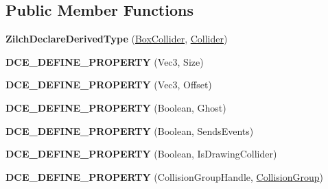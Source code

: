 \subsection*{Public Member Functions}
\begin{DoxyCompactItemize}
\item 
\hypertarget{classDCEngine_1_1Components_1_1BoxCollider_a307a276bd1efb29731cd1e6ab8234381}{{\bfseries Zilch\-Declare\-Derived\-Type} (\hyperlink{classDCEngine_1_1Components_1_1BoxCollider}{Box\-Collider}, \hyperlink{classDCEngine_1_1Components_1_1Collider}{Collider})}\label{classDCEngine_1_1Components_1_1BoxCollider_a307a276bd1efb29731cd1e6ab8234381}

\item 
\hypertarget{classDCEngine_1_1Components_1_1BoxCollider_a9ef080e6ea657589e6b0c5dcff467bad}{{\bfseries D\-C\-E\-\_\-\-D\-E\-F\-I\-N\-E\-\_\-\-P\-R\-O\-P\-E\-R\-T\-Y} (Vec3, Size)}\label{classDCEngine_1_1Components_1_1BoxCollider_a9ef080e6ea657589e6b0c5dcff467bad}

\item 
\hypertarget{classDCEngine_1_1Components_1_1BoxCollider_ac58ada13086efa016c4b0e22766acc6c}{{\bfseries D\-C\-E\-\_\-\-D\-E\-F\-I\-N\-E\-\_\-\-P\-R\-O\-P\-E\-R\-T\-Y} (Vec3, Offset)}\label{classDCEngine_1_1Components_1_1BoxCollider_ac58ada13086efa016c4b0e22766acc6c}

\item 
\hypertarget{classDCEngine_1_1Components_1_1BoxCollider_a292c0ad46d3c02aee5eff549be6db3e6}{{\bfseries D\-C\-E\-\_\-\-D\-E\-F\-I\-N\-E\-\_\-\-P\-R\-O\-P\-E\-R\-T\-Y} (Boolean, Ghost)}\label{classDCEngine_1_1Components_1_1BoxCollider_a292c0ad46d3c02aee5eff549be6db3e6}

\item 
\hypertarget{classDCEngine_1_1Components_1_1BoxCollider_a366fa7cdb6f591cf99034d2450002657}{{\bfseries D\-C\-E\-\_\-\-D\-E\-F\-I\-N\-E\-\_\-\-P\-R\-O\-P\-E\-R\-T\-Y} (Boolean, Sends\-Events)}\label{classDCEngine_1_1Components_1_1BoxCollider_a366fa7cdb6f591cf99034d2450002657}

\item 
\hypertarget{classDCEngine_1_1Components_1_1BoxCollider_a15aec7971b17486617b45a032f2e279b}{{\bfseries D\-C\-E\-\_\-\-D\-E\-F\-I\-N\-E\-\_\-\-P\-R\-O\-P\-E\-R\-T\-Y} (Boolean, Is\-Drawing\-Collider)}\label{classDCEngine_1_1Components_1_1BoxCollider_a15aec7971b17486617b45a032f2e279b}

\item 
\hypertarget{classDCEngine_1_1Components_1_1BoxCollider_a21faa64bc4ebcf53b59b3ac7571c0333}{{\bfseries D\-C\-E\-\_\-\-D\-E\-F\-I\-N\-E\-\_\-\-P\-R\-O\-P\-E\-R\-T\-Y} (Collision\-Group\-Handle, \hyperlink{classDCEngine_1_1CollisionGroup}{Collision\-Group})}\label{classDCEngine_1_1Components_1_1BoxCollider_a21faa64bc4ebcf53b59b3ac7571c0333}


\end{DoxyCompactItemize}
